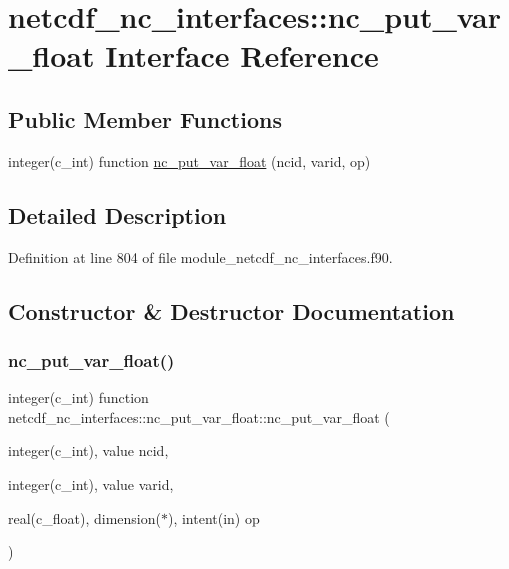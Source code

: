 \hypertarget{interfacenetcdf__nc__interfaces_1_1nc__put__var__float}{}\section{netcdf\+\_\+nc\+\_\+interfaces\+:\+:nc\+\_\+put\+\_\+var\+\_\+float Interface Reference}
\label{interfacenetcdf__nc__interfaces_1_1nc__put__var__float}
\subsection*{Public Member Functions}
\begin{DoxyCompactItemize}
\item 
integer(c\+\_\+int) function \hyperlink{interfacenetcdf__nc__interfaces_1_1nc__put__var__float_ac5a0b06c683cadf69e8121396d356d8e}{nc\+\_\+put\+\_\+var\+\_\+float} (ncid, varid, op)
\end{DoxyCompactItemize}


\subsection{Detailed Description}


Definition at line 804 of file module\+\_\+netcdf\+\_\+nc\+\_\+interfaces.\+f90.



\subsection{Constructor \& Destructor Documentation}
\mbox{\label{interfacenetcdf__nc__interfaces_1_1nc__put__var__float_ac5a0b06c683cadf69e8121396d356d8e}} 
\subsubsection{\texorpdfstring{nc\+\_\+put\+\_\+var\+\_\+float()}{nc\_put\_var\_float()}}
{\footnotesize\ttfamily integer(c\+\_\+int) function netcdf\+\_\+nc\+\_\+interfaces\+::nc\+\_\+put\+\_\+var\+\_\+float\+::nc\+\_\+put\+\_\+var\+\_\+float (\begin{DoxyParamCaption}\item[{integer(c\+\_\+int), value}]{ncid,  }\item[{integer(c\+\_\+int), value}]{varid,  }\item[{real(c\+\_\+float), dimension($\ast$), intent(in)}]{op }\end{DoxyParamCaption})}



